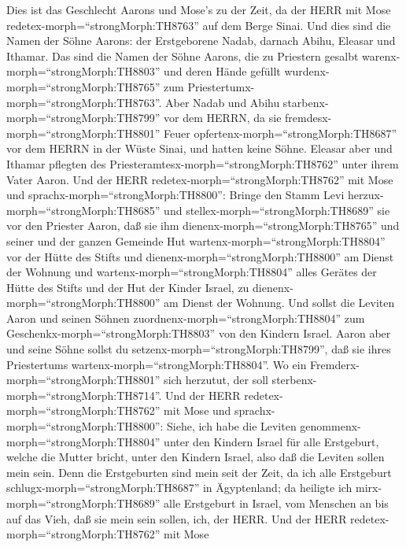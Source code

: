  Dies ist das Geschlecht Aarons und Mose's zu der Zeit, da
der HERR mit Mose redetex-morph=``strongMorph:TH8763'' auf dem Berge
Sinai.  Und dies sind die Namen der Söhne Aarons: der
Erstgeborene Nadab, darnach Abihu, Eleasar und Ithamar.  Das
sind die Namen der Söhne Aarons, die zu Priestern gesalbt
warenx-morph=``strongMorph:TH8803'' und deren Hände gefüllt
wurdenx-morph=``strongMorph:TH8765'' zum
Priestertumx-morph=``strongMorph:TH8763''.  Aber Nadab und
Abihu starbenx-morph=``strongMorph:TH8799'' vor dem HERRN, da sie
fremdesx-morph=``strongMorph:TH8801'' Feuer
opfertenx-morph=``strongMorph:TH8687'' vor dem HERRN in der Wüste Sinai,
und hatten keine Söhne. Eleasar aber und Ithamar pflegten des
Priesteramtesx-morph=``strongMorph:TH8762'' unter ihrem Vater Aaron.
 Und der HERR redetex-morph=``strongMorph:TH8762'' mit Mose
und sprachx-morph=``strongMorph:TH8800'':  Bringe den Stamm
Levi herzux-morph=``strongMorph:TH8685'' und
stellex-morph=``strongMorph:TH8689'' sie vor den Priester Aaron, daß sie
ihm dienenx-morph=``strongMorph:TH8765''  und seiner und der
ganzen Gemeinde Hut wartenx-morph=``strongMorph:TH8804'' vor der Hütte
des Stifts und dienenx-morph=``strongMorph:TH8800'' am Dienst der
Wohnung  und wartenx-morph=``strongMorph:TH8804'' alles
Gerätes der Hütte des Stifts und der Hut der Kinder Israel, zu
dienenx-morph=``strongMorph:TH8800'' am Dienst der Wohnung. 
Und sollst die Leviten Aaron und seinen Söhnen
zuordnenx-morph=``strongMorph:TH8804'' zum
Geschenkx-morph=``strongMorph:TH8803'' von den Kindern Israel.
 Aaron aber und seine Söhne sollst du
setzenx-morph=``strongMorph:TH8799'', daß sie ihres Priestertums
wartenx-morph=``strongMorph:TH8804''. Wo ein
Fremderx-morph=``strongMorph:TH8801'' sich herzutut, der soll
sterbenx-morph=``strongMorph:TH8714''.  Und der HERR
redetex-morph=``strongMorph:TH8762'' mit Mose und
sprachx-morph=``strongMorph:TH8800'':  Siehe, ich habe die
Leviten genommenx-morph=``strongMorph:TH8804'' unter den Kindern Israel
für alle Erstgeburt, welche die Mutter bricht, unter den Kindern Israel,
also daß die Leviten sollen mein sein.  Denn die
Erstgeburten sind mein seit der Zeit, da ich alle Erstgeburt
schlugx-morph=``strongMorph:TH8687'' in Ägyptenland; da heiligte ich
mirx-morph=``strongMorph:TH8689'' alle Erstgeburt in Israel, vom
Menschen an bis auf das Vieh, daß sie mein sein sollen, ich, der HERR.
 Und der HERR redetex-morph=``strongMorph:TH8762'' mit Mose
